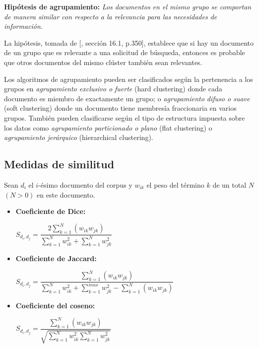 \documentclass{llncs}
\begin{document}
\vspace{1em}
\textbf{Hip\'otesis de agrupamiento:} \textit{Los documentos en el mismo grupo se comportan de manera similar con respecto a la relevancia para las necesidades de información.}
	
\vspace{0.3em}
La hipótesis, tomada de [\cite{B1}, secci\'on 16.1, p.350], establece que si hay un documento de un grupo que es relevante a una solicitud de búsqueda, entonces es probable que otros documentos del mismo clúster también sean relevantes. 
\vspace{1em}

Los algoritmos de agrupamiento pueden ser clasificados seg\'un la pertenencia a los grupos en \textit{agrupamiento exclusivo o fuerte} (hard clustering) donde cada documento es miembro de exactamente un grupo; o \textit{agrupamiento difuso o suave} (soft clustering) donde un documento tiene membresía fraccionaria en varios grupos. Tambi\'en pueden clasificarse seg\'un el tipo de estructura impuesta sobre los datos como \textit{agrupamiento particionado o plano} (flat clustering) o \textit{agrupamiento jer\'arquico} (hierarchical clustering).

\subsection{Medidas de similitud}

Sean $ d_{i} $ el $ i $-ésimo documento del corpus y $ w_{ik} $ el peso del t\'ermino $ k $ de un total $ N $ $ (N>0) $ en este documento.

\begin{itemize}
	\item \textbf{Coeficiente de Dice:}
	\begin{center}
		$ S_{d_{i}, d_{j}} = \dfrac{2 \sum_{k=1}^{N} (w_{ik}w_{jk})}{\sum_{k=1}^{N}w_{ik}^{2} + \sum_{k=1}^{N}w_{jk}^{2}} $ 
	\end{center}
	\item \textbf{Coeficiente de Jaccard:}
	\begin{center}
		$ S_{d_{i}, d_{j}} = \dfrac{\sum_{k=1}^{N} (w_{ik}w_{jk})}{\sum_{k=1}^{N}w_{ik}^{2} + \sum_{k=1}^{max}w_{jk}^{2} - \sum_{k=1}^{N} (w_{ik}w_{jk})} $
	\end{center}
	\item \textbf{Coeficiente del coseno:}
	\begin{center}
		$ S_{d_{i}, d_{j}} = \dfrac{\sum_{k=1}^{N} (w_{ik}w_{jk})}{\sqrt{\sum_{k=1}^{N}w_{ik}^{2} \sum_{k=1}^{N}w_{jk}^{2}}} $
	\end{center}
\end{itemize}
\end{document}
